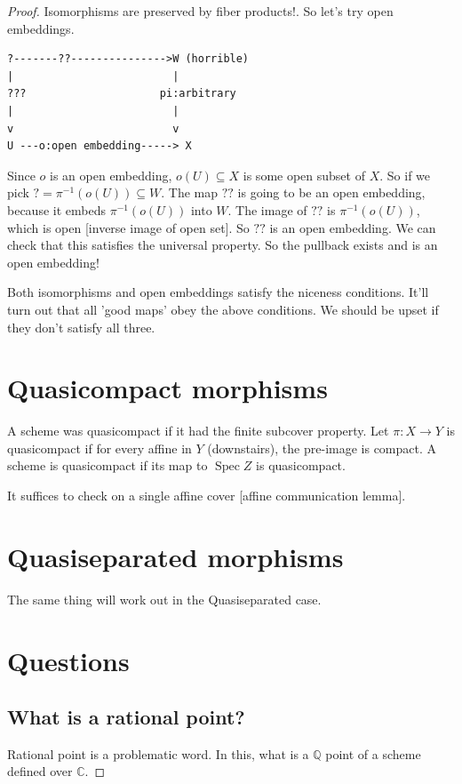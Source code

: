 \documentclass{book}
\newcommand{\Q}{\ensuremath{\mathbb{Q}}}
\newcommand{\C}{\ensuremath{\mathbb{C}}}
\newcommand{\spec}{\operatorname{Spec}}
\theoremstyle{definition}
\begin{document}
\begin{proof}
Isomorphisms are preserved by fiber products!. So let's try open embeddings.


\begin{verbatim}
?-------??--------------->W (horrible)
|                         |
???                     pi:arbitrary
|                         |
v                         v
U ---o:open embedding-----> X
\end{verbatim}

Since $o$ is an open embedding, $o(U) \subseteq X$ is some open subset of $X$. So if we 
pick $? = \pi^{-1}(o(U)) \subseteq W$. The map $??$ is going to be an open embedding, because
it embeds $\pi^{-1}(o(U))$ into $W$. The image of $??$ is $\pi^{-1}(o(U))$, which
is open [inverse image of open set]. So $??$ is an open embedding. We can check
that this satisfies the universal property. So the pullback exists and is an open embedding!


Both isomorphisms and open embeddings satisfy the niceness conditions. It'll turn
out that all 'good maps' obey the above conditions. We should be upset if they
don't satisfy all three.

\section{Quasicompact morphisms}

A scheme was quasicompact if it had the finite subcover property.
Let $\pi: X \rightarrow Y$ is quasicompact if for every affine in $Y$ (downstairs),
the pre-image is compact. A scheme is quasicompact if its map to $\spec Z$ is quasicompact.

It suffices to check on a single affine cover [affine communication lemma].


\section{Quasiseparated morphisms}
The same thing will work out in the Quasiseparated case.

\section{Questions}
\subsection{What is a rational point?}
Rational point is a problematic word. In this, what is a $\Q$ point of a scheme
defined over $\C$.


\end{proof}
\end{document}
